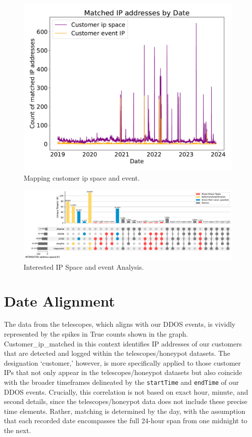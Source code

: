 \begin{figure}[htbp]
    \centering
    \includegraphics[scale=0.30]{graphs/matched_customer_graph.pdf}
    \caption{Mapping customer ip space and event.}
    \label{fig:mappedcustomergraph}
    \end{figure}

\begin{figure}[htbp]
    \centering
    \includegraphics[scale=0.48]{graphs/noir3.pdf}
    \caption{Interested IP Space and event Analysis.}
    \label{fig:Mappedaddressanalysis}
    \end{figure}

\section{Date Alignment}\label{sec:date_events_alignment}
The data from the telescopes, which aligns with our DDOS events, is vividly represented by the spikes in True counts shown in the graph. 
Customer\_ip\_matched in this context identifies IP addresses of our customers that are detected and logged within the telescopes/honeypot datasets. The designation `customer,' however, is more specifically applied to those customer IPs that not only appear in the telescopes/honeypot datasets but also coincide with the broader timeframes delineated by the \texttt{startTime} and \texttt{endTime} of our DDOS events. Crucially, this correlation is not based on exact hour, minute, and second details, since the telescopes/honeypot data does not include these precise time elements. Rather, matching is determined by the day, with the assumption that each recorded date encompasses the full 24-hour span from one midnight to the next.
